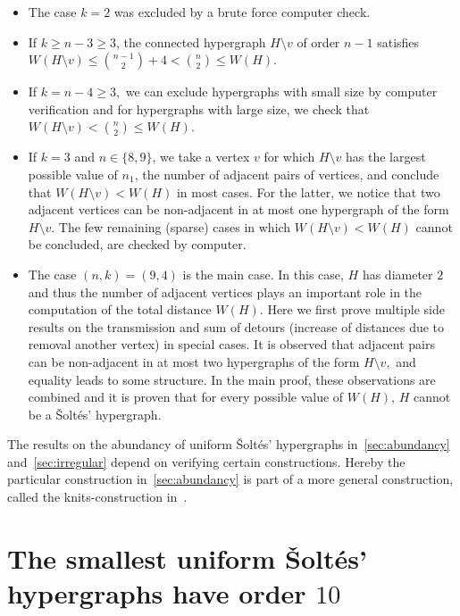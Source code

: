 \documentclass[a4paper,11pt]{article}
\begin{document}
\begin{itemize}
    \item The case $k=2$ was excluded by a brute force computer check.
    \item If $k \ge n-3 \ge 3$, the connected hypergraph $H \setminus v$ of order $n-1$ satisfies $W(H \setminus v) \le \binom{n-1}{2}+4 < \binom{n}{2} \le W(H)$.
    \item If $k=n-4\ge 3,$ we can exclude hypergraphs with small size by computer verification and for hypergraphs with large size, we check that $W(H \setminus v) < \binom{n}{2} \le W(H)$.
    \item If $k=3$ and $n \in \{8,9\}$, we take a vertex $v$ for which $H \setminus v$ has the largest possible value of $n_1$, the number of adjacent pairs of vertices, and conclude that $W(H \setminus v)<W(H)$ in most cases. For the latter, we notice that two adjacent vertices can be non-adjacent in at most one hypergraph of the form $H \setminus v.$
    The few remaining (sparse) cases in which $W(H \setminus v)<W(H)$ cannot be concluded, are checked by computer.
    \item The case $(n,k)=(9,4)$ is the main case. In this case, $H$ has diameter $2$ and thus the number of adjacent vertices plays an important role in the computation of the total distance $W(H).$
    Here we first prove multiple side results on the transmission and sum of detours (increase of distances due to removal another vertex) in special cases.
    It is observed that adjacent pairs can be non-adjacent in at most two hypergraphs of the form $H \setminus v,$ and equality leads to some structure.
    In the main proof, these observations are combined and it is proven that for every possible value of $W(H)$, $H$ cannot be a \v Solt\'es' hypergraph. 
\end{itemize}

The results on the abundancy of uniform \v Solt\'es' hypergraphs in~\cref{sec:abundancy} and~\cref{sec:irregular} depend on verifying certain constructions. Hereby the particular construction in~\cref{sec:abundancy} is part of a more general construction, called the knits-construction in~\cite{Tiwari25thesis}.


\section{The smallest uniform \v Solt\'es' hypergraphs have order $10$}\label{sec:minimum_USH}
\end{document}
